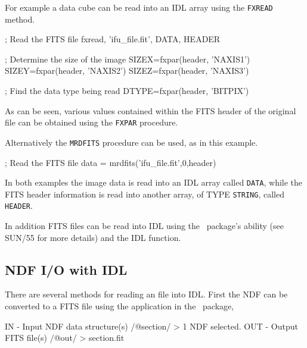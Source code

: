 \documentclass[twoside,11pt]{starlink}
\providecommand{\CONVERT}{{\footnotesize CONVERT}\normalsize}
\providecommand{\CONVERTref}{\xref{\CONVERT}{sun55}{}}
\begin{document}
For example a data cube can be read into an IDL array using the \texttt{FXREAD} method.

\begin{small}
\begin{terminalv}
; Read the FITS file
fxread, 'ifu_file.fit', DATA, HEADER

; Determine the size of the image
SIZEX=fxpar(header, 'NAXIS1')
SIZEY=fxpar(header, 'NAXIS2')
SIZEZ=fxpar(header, 'NAXIS3')

; Find the data type being read
DTYPE=fxpar(header, 'BITPIX')
\end{terminalv}
\end{small}

As can be seen, various values contained within the FITS header of the
original file can be obtained using the \texttt{FXPAR} procedure.

Alternatively the \texttt{MRDFITS} procedure can be used, as in this
example.

\begin{small}
\begin{terminalv}
; Read the FITS file
data = mrdfits('ifu_file.fit',0,header)
\end{terminalv}
\end{small}

In both examples the image data is read into an IDL array called \texttt{DATA}, while the FITS header information is read into another array,
of TYPE \texttt{STRING}, called \texttt{HEADER}.

In addition FITS files can be read into IDL using the
\CONVERTref\normalsize\ package's 
ability (see SUN/55 for more details) and the  IDL function.

\subsection{NDF I/O with IDL\label{sc16_ndfidl}}

There are several methods for reading an  file into
IDL.  First the NDF can be converted to a FITS file using the
 application in the \CONVERTref\
package,

\begin{small}
\begin{terminalv}
IN - Input NDF data structure(s) /@section/ >
1 NDF selected.
OUT - Output FITS file(s) /@out/ > section.fit
%
\end{terminalv}
\end{small}
\end{document}
